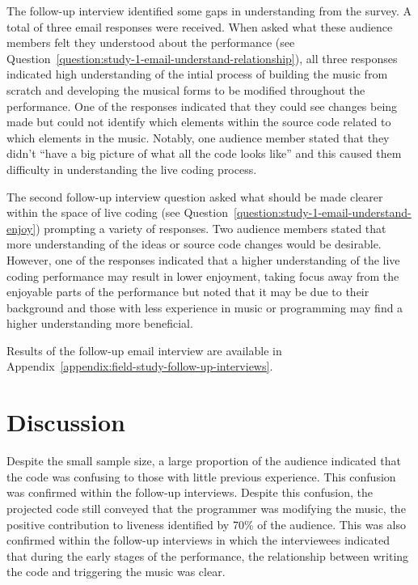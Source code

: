 The follow-up interview identified some gaps in understanding from the survey. A total of three email responses were received. When asked what these audience members felt they understood about the performance (see Question~\ref{question:study-1-email-understand-relationship}), all three responses indicated high understanding of the intial process of building the music from scratch and developing the musical forms to be modified throughout the performance. One of the responses indicated that they could see changes being made but could not identify which elements within the source code related to which elements in the music. Notably, one audience member stated that they didn't ``have a big picture of what all the code looks like'' and this caused them difficulty in understanding the live coding process. 

The second follow-up interview question asked what should be made clearer within the space of live coding (see Question~\ref{question:study-1-email-understand-enjoy}) prompting a variety of responses. Two audience members stated that more understanding of the ideas or source code changes would be desirable. However, one of the responses indicated that a higher understanding of the live coding performance may result in lower enjoyment, taking focus away from the enjoyable parts of the performance but noted that it may be due to their background and those with less experience in music or programming may find a higher understanding more beneficial.

Results of the follow-up email interview are available in Appendix~\ref{appendix:field-study-follow-up-interviews}.

\section{Discussion}

Despite the small sample size, a large proportion of the audience indicated that the code was confusing to those with little previous experience. This confusion was confirmed within the follow-up interviews. Despite this confusion, the projected code still conveyed that the programmer was modifying the music, the positive contribution to liveness identified by 70\% of the audience. This was also confirmed within the follow-up interviews in which the interviewees indicated that during the early stages of the performance, the relationship between writing the code and triggering the music was clear.

\more

